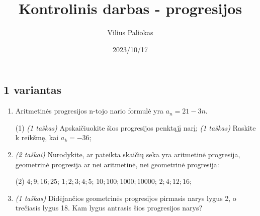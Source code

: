 \documentclass[a4paper]{article}
\title{Kontrolinis darbas - progresijos}
\author{Vilius Paliokas}
\date{2023/10/17}
\begin{document}
\thispagestyle{fancy}

\titlespacing*{\subsection}{0pt}{.75ex}{0.75ex}

\subsection*{1 variantas}

\begin{enumerate}
      \item Aritmetinės progresijos n-tojo nario formulė yra $a_{n}=21-3n$.

            \begin{tasks}[item-format={\normalfont}, after-item-skip=2mm](1)
                  \task \textit{(1 taškas)} Apskaičiuokite šios progresijos
                  penktąjį
                  narį;
                  \task \textit{(1 taškas)} Raskite k reikšmę, kai $a_k=-36$;
            \end{tasks}

      \item \textit{(2 taškai)} Nurodykite, ar pateikta skaičių seka yra
            aritmetinė progresija, geometrinė progresija ar nei aritmetinė, nei
            geometrinė progresija:
            \begin{tasks}[item-format={\normalfont}, after-item-skip=2mm](2)
                  \task $4; 9; 16; 25$;
                  \task $1;2;3;4;5$;
                  \task $10; 100; 1000; 10000$;
                  \task $2;4;12;16$;
            \end{tasks}

      \item \textit{(1 taškas)} Didėjančios geometrinės progresijos pirmasis
            narys lygus 2, o trečiasis lygus 18. Kam lygus antrasis šios
            progresijos narys?


\end{enumerate}
\end{document}
